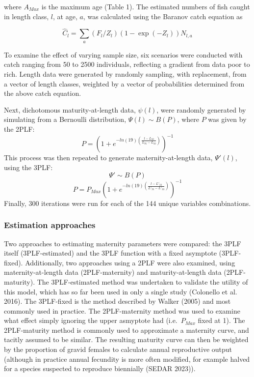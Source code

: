 \documentclass[
]{article}
\begin{document}
where \(A_{Max}\) is the maximum age (Table 1). The estimated numbers of fish caught in length class, \(l\), at age, \(a\), was calculated using the Baranov catch equation as

\[
\hat{C}_{l} = \sum_a(F_{l}/Z_{l})(1-\exp(-Z_{l}))N_{l,a}
\]

To examine the effect of varying sample size, six scenarios were conducted with catch ranging from 50 to 2500 individuals, reflecting a gradient from data poor to rich. Length data were generated by randomly sampling, with replacement, from a vector of length classes, weighted by a vector of probabilities determined from the above catch equation.

Next, dichotomous maturity-at-length data, \(\psi(l)\), were randomly generated by simulating from a Bernoulli distribution, \(\Psi(l) \sim B(P)\), where \(P\) was given by the 2PLF: \[P =  \left ( 1 + e^{-ln(19)\left ( \frac{l - L_{50}}{L_{95} - L_{50}} \right )}  \right )^{-1}\] This process was then repeated to generate maternity-at-length data, \(\Psi'(l)\), using the 3PLF: \[\Psi' \sim B(P)\] \[P =  P_{Max}\left ( 1 + e^{-ln(19)\left ( \frac{l - L'_{50}}{L'_{95} - L'_{50}} \right )}  \right )^{-1}\] Finally, 300 iterations were run for each of the 144 unique variables combinations.

\subsubsection{Estimation approaches}\label{estimation-approaches}

Two approaches to estimating maternity parameters were compared: the 3PLF itself (3PLF-estimated) and the 3PLF function with a fixed asymptote (3PLF-fixed). Additionally, two approaches using a 2PLF were also examined, using maternity-at-length data (2PLF-maternity) and maturity-at-length data (2PLF-maturity). The 3PLF-estimated method was undertaken to validate the utility of this model, which has so far been used in only a single study (Colonello et al. 2016). The 3PLF-fixed is the method described by Walker (2005) and most commonly used in practice. The 2PLF-maternity method was used to examine what effect simply ignoring the upper asmyptote had (i.e.~\(P_{Max}\) fixed at 1). The 2PLF-maturity method is commonly used to approximate a maternity curve, and tacitly assumed to be similar. The resulting maturity curve can then be weighted by the proportion of gravid females to calculate annual reproductive output (although in practice annual fecundity is more often modified, for example halved for a species suspected to reproduce biennially (SEDAR 2023)).
\end{document}
